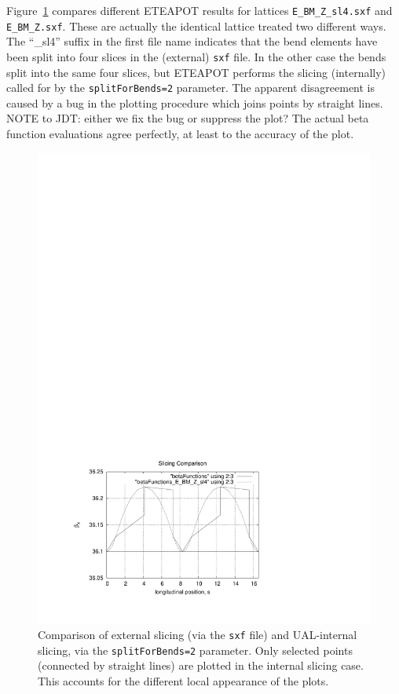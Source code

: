 \documentclass[]{article}
\begin{document}
Figure~\ref{fig:SliceCompare} compares different
ETEAPOT results for lattices {\tt E\_BM\_Z\_sl4.sxf}
and {\tt E\_BM\_Z.sxf}. These are actually the identical
lattice treated two different ways. The ``\_sl4''
suffix in the first file name indicates that the
bend elements have been split into four slices in
the (external) {\tt sxf} file. In the other case the
bends split into the same four slices, but 
ETEAPOT performs the slicing (internally) called for
by the {\tt splitForBends=2} parameter. The apparent
disagreement is caused by a bug in the plotting procedure
which joins points by straight lines. NOTE to JDT: 
either we fix the bug or suppress the plot? The actual
beta function evaluations agree perfectly, at least to
the accuracy of the plot.
%
\begin{figure}[h]
\centering
\includegraphics[scale=0.6]{pdf/SliceCompare.pdf}
\caption{\label{fig:SliceCompare}Comparison of external slicing
(via the {\tt sxf} file) and UAL-internal slicing, via the 
{\tt splitForBends=2} parameter. Only selected points (connected 
by straight lines) are plotted in the internal slicing case. 
This accounts for the different local appearance of the plots.}
\end{figure}
%
\end{document}
